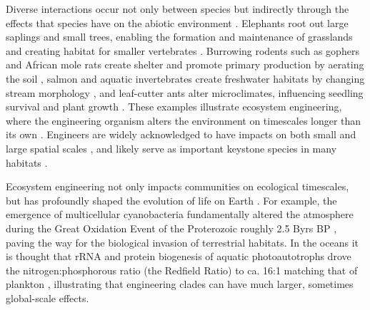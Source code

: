\documentclass[twocolumn,preprintnumbers,amsmath,amssymb,superscriptaddress,linenumbers]{revtex4-1}
\begin{document}
Diverse interactions occur not only between species but indirectly through the effects that species have on the abiotic environment \cite{Jones1994,Olff2009,OdlingSmee2013}.
Elephants root out large saplings and small trees, enabling the formation and maintenance of grasslands \cite{Leuthold1996,Haynes2012} and creating habitat for smaller vertebrates \cite{Pringle2008}.
Burrowing rodents such as gophers and African mole rats create shelter and promote primary production by aerating the soil \cite{Reichman2002,Hagenah2013}, salmon and aquatic invertebrates create freshwater habitats by changing stream morphology \cite{Moore2006}, and leaf-cutter ants alter microclimates, influencing seedling survival and plant growth \cite{Meyer2011}.
These examples illustrate ecosystem engineering, where the engineering organism alters the environment on timescales longer than its own \cite{Hastings2007}.
Engineers are widely acknowledged to have impacts on both small and large spatial scales \cite{Wright2006b}, and likely serve as important keystone species in many habitats \cite{Jones2012}.

Ecosystem engineering not only impacts communities on ecological timescales, but has profoundly shaped the evolution of life on Earth \cite{Erwin2008}.
For example, the emergence of multicellular cyanobacteria fundamentally altered the atmosphere during the Great Oxidation Event of the Proterozoic roughly 2.5 Byrs BP \cite{Erwin2008,Schirrmeister2013}, paving the way for the biological invasion of terrestrial habitats.
In the oceans it is thought that rRNA and protein biogenesis of aquatic photoautotrophs drove the nitrogen:phosphorous ratio (the Redfield Ratio) to ca. 16:1 matching that of plankton \cite{Loladze2011}, illustrating that engineering clades can have much larger, sometimes global-scale effects.
\end{document}
